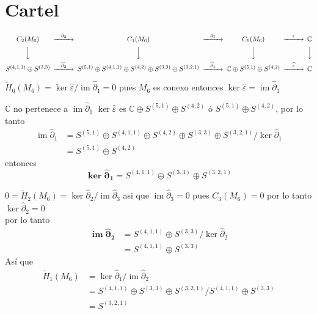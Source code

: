 \documentclass[12pt]{book}
\theoremstyle{definition}
\DeclareMathOperator{\im}{im}
\newcounter{in}
\begin{document}
\chapter{Cartel}

\begin{small}
 \[
  \begin{CD}
    C_{2}(M_{6}) @>{\partial_{2}}>> C_{1}(M_{6}) @>{\partial_{1}}>> C_{0}(M_{6}) @>{\varepsilon}>> \mathbb{C}\\
    @VVV   @VVV   @VVV   @VVV    \\
    S^{(4,1,1)}\oplus S^{(3,3)} @>{\widehat\partial_{2}}>>
    S^{(5,1)}\oplus S^{(4,1,1)}\oplus S^{(4,2)}\oplus S^{(3,3)}\oplus S^{(3,2,1)} @>{\widehat\partial_{1}}>> 
    \mathbb{C} \oplus S^{(5,1)}\oplus S^{(4,2)} @>{\widehat \varepsilon}>>  \mathbb{C}
  \end{CD}
  \]
\end{small}

$\widetilde H_{0}(M_{6})=\ker\widehat\varepsilon/\im\widehat\partial_{1}=0$ pues
$M_{6}$ es conexo entonces
$\ker\widehat\varepsilon=\im\widehat\partial_{1}$

$\mathbb{C}$ no pertenece a $\im\widehat\partial_{1}$
$\ker\widehat\varepsilon$ es $\mathbb{C} \oplus S^{(5,1)}\oplus
S^{(4,2)}$ ó $S^{(5,1)}\oplus S^{(4,2)}$, por lo tanto
\begin{align*}
   \im\widehat\partial_{1}&=S^{(5,1)}\oplus S^{(4,1,1)}\oplus S^{(4,2)}\oplus S^{(3,3)}\oplus S^{(3,2,1)}/\ker\widehat\partial_{1}\\
   &=S^{(5,1)}\oplus S^{(4,2)}
\end{align*}
entonces 
$$\boldsymbol{\ker\widehat\partial_{1}}=S^{(4,1,1)}\oplus S^{(3,3)}\oplus S^{(3,2,1)}$$

$0=\widetilde H_{2}(M_{6})=\ker\widehat\partial_{2}/\im\widehat\partial_{3}$
asi que $\im\widehat\partial_{3}=0$ pues $C_{3}(M_{6})=0$
por lo tanto $\ker\widehat\partial_{2}=0$\\

por lo tanto 
\begin{align*}
  \boldsymbol{\im\widehat\partial_{2}}&=S^{(4,1,1)}\oplus
  S^{(3,3)}/\ker\widehat\partial_{2}\\
  &=S^{(4,1,1)}\oplus S^{(3,3)}
\end{align*}
Así que 
\begin{align}
  \label{eq:4}
  \widetilde
  H_{1}(M_{6})&=\ker\widehat\partial_{1}/\im\widehat\partial_{2}\\
  &=S^{(4,1,1)}\oplus S^{(3,3)}\oplus S^{(3,2,1)}/ S^{(4,1,1)}\oplus S^{(3,3)}\\
  &=S^{(3,2,1)}
\end{align}
\end{document}
